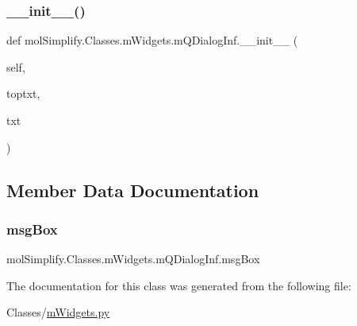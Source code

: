 \subsubsection{\texorpdfstring{\+\_\+\+\_\+init\+\_\+\+\_\+()}{\_\_init\_\_()}}
{\footnotesize\ttfamily def mol\+Simplify.\+Classes.\+m\+Widgets.\+m\+Q\+Dialog\+Inf.\+\_\+\+\_\+init\+\_\+\+\_\+ (\begin{DoxyParamCaption}\item[{}]{self,  }\item[{}]{toptxt,  }\item[{}]{txt }\end{DoxyParamCaption})}



\subsection{Member Data Documentation}
\mbox{\label{classmolSimplify_1_1Classes_1_1mWidgets_1_1mQDialogInf_a745462b985bfaeafa1603f5567505bd3}} 
\subsubsection{\texorpdfstring{msg\+Box}{msgBox}}
{\footnotesize\ttfamily mol\+Simplify.\+Classes.\+m\+Widgets.\+m\+Q\+Dialog\+Inf.\+msg\+Box}



The documentation for this class was generated from the following file\+:\begin{DoxyCompactItemize}
\item 
Classes/\hyperlink{mWidgets_8py}{m\+Widgets.\+py}\end{DoxyCompactItemize}
